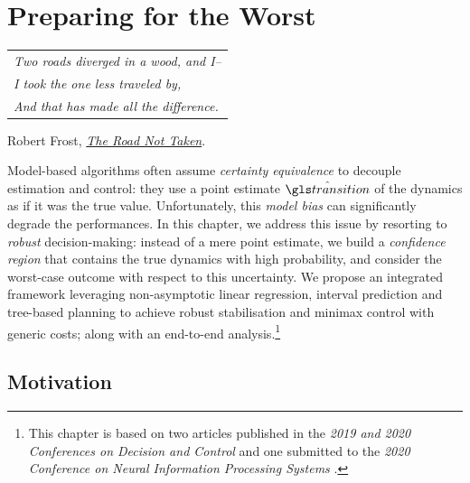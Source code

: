 
\graphicspath{{2-Chapters/7-Chapter/}}

\chapter{Preparing for the Worst}
\label{chapter:7}

\begin{flushright}
	\begin{tabular}{@{}l@{}}
		\emph{Two roads diverged in a wood, and I--}\\
		\emph{I took the one less traveled by,}\\
		\emph{And that has made all the difference.}\\
	\end{tabular}
	
	Robert Frost, \href{https://eleurent.github.io/sisyphe/texts/the-road-not-taken.html}{\emph{The Road Not Taken}}.
\end{flushright}

\abstractStartChapter{}%
Model-based algorithms often assume \emph{certainty equivalence} to decouple estimation and control: they use a point estimate $\hat{\Ps}$ of the dynamics as if it was the true value. Unfortunately, this \textit{model bias} can significantly degrade the performances. In this chapter, we address this issue by resorting to \emph{robust} decision-making: instead of a mere point estimate, we build a \emph{confidence region} that contains the true dynamics with high probability, and consider the worst-case outcome with respect to this uncertainty. We propose an integrated framework leveraging non-asymptotic linear regression, interval prediction and tree-based planning to achieve robust stabilisation and minimax control with generic costs; along with an end-to-end analysis.\footnote{This chapter is based on two articles published in the \emph{2019 and 2020 Conferences on Decision and Control} \citep{Leurent2019interval,Leurent2020robust} and one submitted to the \emph{2020 Conference on Neural Information Processing Systems} \citep{Leurent2020beyond}.}
\minitocStartChapter{}

\section{Motivation}
\label{sec:robust-motivation}

